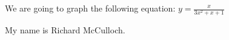 \documentclass[12pt]{article}
\def\eq1{y=\frac{x}{3x^2+x+1}}
\def\name{Richard McCulloch}
\begin{document}
We are going to graph the following equation: $\eq1$

My name is \name.
\end{document}
